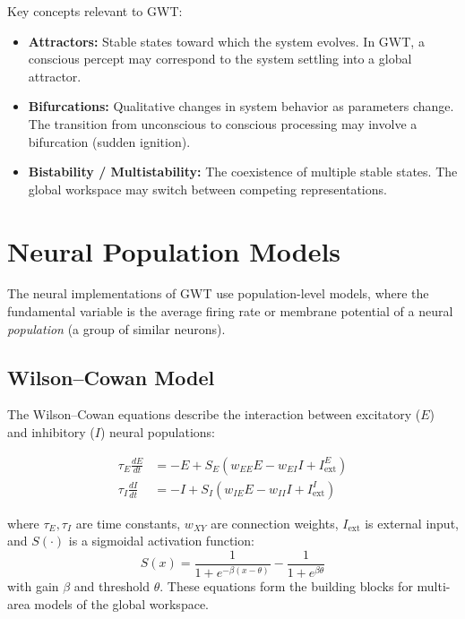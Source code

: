 \documentclass[11pt,a4paper]{report}
\begin{document}
Key concepts relevant to GWT:
\begin{itemize}[leftmargin=1.5em]
  \item \textbf{Attractors:} Stable states toward which the system evolves. In GWT, a conscious percept may correspond to the system settling into a global attractor.
  \item \textbf{Bifurcations:} Qualitative changes in system behavior as parameters change. The transition from unconscious to conscious processing may involve a bifurcation (sudden ignition).
  \item \textbf{Bistability / Multistability:} The coexistence of multiple stable states. The global workspace may switch between competing representations.
\end{itemize}

\section{Neural Population Models}

The neural implementations of GWT use population-level models, where the fundamental variable is the average firing rate or membrane potential of a neural \emph{population} (a group of similar neurons).

\subsection{Wilson--Cowan Model}

The Wilson--Cowan equations describe the interaction between excitatory ($E$) and inhibitory ($I$) neural populations:

\begin{mathbox}
\vspace{-6pt}
\begin{align}
  \tau_E \frac{dE}{dt} &= -E + S_E\!\left(w_{EE} E - w_{EI} I + I_{\text{ext}}^E\right) \label{eq:wc_e}\\[6pt]
  \tau_I \frac{dI}{dt} &= -I + S_I\!\left(w_{IE} E - w_{II} I + I_{\text{ext}}^I\right) \label{eq:wc_i}
\end{align}
\vspace{-8pt}
\end{mathbox}

where $\tau_E, \tau_I$ are time constants, $w_{XY}$ are connection weights, $I_{\text{ext}}$ is external input, and $S(\cdot)$ is a sigmoidal activation function:
\[
  S(x) = \frac{1}{1 + e^{-\beta(x - \theta)}} - \frac{1}{1 + e^{\beta\theta}}
\]
with gain $\beta$ and threshold $\theta$. These equations form the building blocks for multi-area models of the global workspace.
\end{document}
